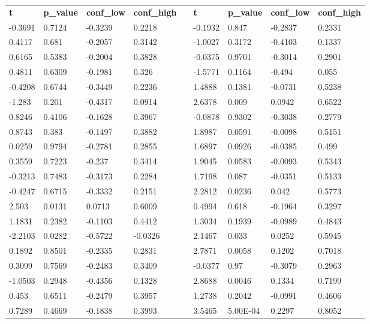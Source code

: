 \begin{table}[h!]
\small
\begin{tabular}{lllllllll}
\textbf{t} & \textbf{p\_value} & \textbf{conf\_low} & \textbf{conf\_high} & \textbf{} & \textbf{t} & \textbf{p\_value} & \textbf{conf\_low} & \textbf{conf\_high} \\ \cline{1-4} \cline{6-9} 
-0.3691 & 0.7124 & -0.3239 & 0.2218 &  & -0.1932 & 0.847 & -0.2837 & 0.2331 \\
0.4117 & 0.681 & -0.2057 & 0.3142 &  & -1.0027 & 0.3172 & -0.4103 & 0.1337 \\
0.6165 & 0.5383 & -0.2004 & 0.3828 &  & -0.0375 & 0.9701 & -0.3014 & 0.2901 \\
0.4811 & 0.6309 & -0.1981 & 0.326 &  & -1.5771 & 0.1164 & -0.494 & 0.055 \\
-0.4208 & 0.6744 & -0.3449 & 0.2236 &  & 1.4888 & 0.1381 & -0.0731 & 0.5238 \\
-1.283 & 0.201 & -0.4317 & 0.0914 &  & 2.6378 & 0.009 & 0.0942 & 0.6522 \\
0.8246 & 0.4106 & -0.1628 & 0.3967 &  & -0.0878 & 0.9302 & -0.3038 & 0.2779 \\
0.8743 & 0.383 & -0.1497 & 0.3882 &  & 1.8987 & 0.0591 & -0.0098 & 0.5151 \\
0.0259 & 0.9794 & -0.2781 & 0.2855 &  & 1.6897 & 0.0926 & -0.0385 & 0.499 \\
0.3559 & 0.7223 & -0.237 & 0.3414 &  & 1.9045 & 0.0583 & -0.0093 & 0.5343 \\
-0.3213 & 0.7483 & -0.3173 & 0.2284 &  & 1.7198 & 0.087 & -0.0351 & 0.5133 \\
-0.4247 & 0.6715 & -0.3332 & 0.2151 &  & 2.2812 & 0.0236 & 0.042 & 0.5773 \\
2.503 & 0.0131 & 0.0713 & 0.6009 &  & 0.4994 & 0.618 & -0.1964 & 0.3297 \\
1.1831 & 0.2382 & -0.1103 & 0.4412 &  & 1.3034 & 0.1939 & -0.0989 & 0.4843 \\
-2.2103 & 0.0282 & -0.5722 & -0.0326 &  & 2.1467 & 0.033 & 0.0252 & 0.5945 \\
0.1892 & 0.8501 & -0.2335 & 0.2831 &  & 2.7871 & 0.0058 & 0.1202 & 0.7018 \\
0.3099 & 0.7569 & -0.2483 & 0.3409 &  & -0.0377 & 0.97 & -0.3079 & 0.2963 \\
-1.0503 & 0.2948 & -0.4356 & 0.1328 &  & 2.8688 & 0.0046 & 0.1334 & 0.7199 \\
0.453 & 0.6511 & -0.2479 & 0.3957 &  & 1.2738 & 0.2042 & -0.0991 & 0.4606 \\
0.7289 & 0.4669 & -0.1838 & 0.3993 &  & 3.5465 & 5.00E-04 & 0.2297 & 0.8052 \\

\end{tabular}
\end{table}
